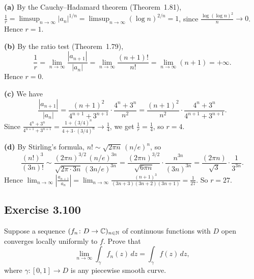 \documentclass{article}
\begin{document}
\begin{solution}
  \textbf{(a)}\;
  By the Cauchy--Hadamard theorem (Theorem~1.81),
  $\frac{1}{r} = \limsup_{n\to\infty} |a_n|^{1/n}
  = \limsup_{n\to\infty} (\log n)^{2/n} = 1$,
  since $\frac{\log(\log n)^2}{n} \to 0$.
  Hence $r = 1$.

  \medskip

  \textbf{(b)}\;
  By the ratio test (Theorem~1.79),
  \[
    \frac{1}{r}
    = \lim_{n\to\infty} \frac{|a_{n+1}|}{|a_n|}
    = \lim_{n\to\infty} \frac{(n+1)!}{n!}
    = \lim_{n\to\infty} (n+1) = +\infty.
  \]
  Hence $r = 0$.

  \medskip

  \textbf{(c)}\;
  We have
  \[
    \frac{|a_{n+1}|}{|a_n|}
    = \frac{(n+1)^2}{4^{n+1}+3^{n+1}}
    \cdot \frac{4^n + 3^n}{n^2}
    = \frac{(n+1)^2}{n^2} \cdot \frac{4^n + 3^n}{4^{n+1}+3^{n+1}}.
  \]
  Since $\frac{4^n + 3^n}{4^{n+1}+3^{n+1}}
  = \frac{1+(3/4)^n}{4+3\cdot(3/4)^n} \to \frac{1}{4}$,
  we get $\frac{1}{r} = \frac{1}{4}$, so $r = 4$.

  \medskip

  \textbf{(d)}\;
  By Stirling's formula, $n! \sim \sqrt{2\pi n}\,(n/e)^n$, so
  \[
    \frac{(n!)^3}{(3n)!}
    \sim \frac{(2\pi n)^{3/2}\,(n/e)^{3n}}
    {\sqrt{2\pi \cdot 3n}\,(3n/e)^{3n}}
    = \frac{(2\pi n)^{3/2}}{\sqrt{6\pi n}}
    \cdot \frac{n^{3n}}{(3n)^{3n}}
    = \frac{(2\pi n)}{\sqrt{3}} \cdot \frac{1}{3^{3n}}.
  \]
  Hence
  $\lim_{n\to\infty} \left|\frac{a_{n+1}}{a_n}\right|
  = \lim_{n\to\infty} \frac{(n+1)^3}{(3n+3)(3n+2)(3n+1)}
  = \frac{1}{27}$.
  So $r = 27$.
\end{solution}

\subsection{Exercise 3.100}

Suppose a sequence $(f_n \colon D \to \mathbb{C})_{n\in\mathbb{N}}$
of continuous functions with $D$ open
converges locally uniformly to $f$.
Prove that
\[
  \lim_{n\to\infty} \int_\gamma f_n(z)\,dz
  = \int_\gamma f(z)\,dz,
\]
where $\gamma \colon [0,1] \to D$ is any piecewise smooth curve.
\end{document}
